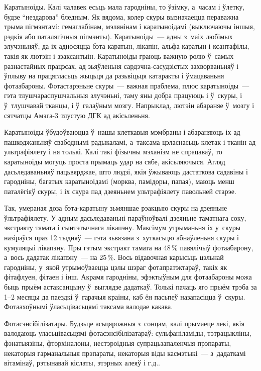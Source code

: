 Каратыноіды. Калі чалавек есьць мала гародніны, то ўзімку, а~часам і ўлетку, будзе ``нездарова'' бледным. Як вядома, колер скуры вызначаецца пераважна трыма пігмэнтамі: гемаглабінам, мэлянінам і каратыноідамі (выключаючы іншыя, рэдкія або паталягічныя пігмэнты). Каратыноіды~--- адны з~маіх любімых злучэньняў, да іх адносяцца бэта-каратын, лікапін, альфа-каратын і ксантафілы, такія як лютэін і зэаксантыін. Каратыноіды граюць важную ролю ў~самых разнастайных працэсах, ад зьяўленьня сардэчна-сасудзістых захворваньняў і ўплыву на працягласьць жыцьця да разьвіцьця катаракты і ўмацаваньня фотаабароны. Фотастарэньне скуры~--- важная праблема, плюс каратыноіды~--- гэта тлушчараспушчальныя злучэньні, таму яны добра працуюць і ў~скуры, і ў~тлушчавай тканцы, і ў~галаўным мозгу. Напрыклад, лютэін абараняе ў~мозгу і сятчатцы Амэга-3 тлустую ДГК ад акісьленьня. 

Каратыноіды ўбудоўваюцца ў~нашы клеткавыя мэмбраны і абараняюць іх ад пашкоджаньняў свабоднымі радыкаламі, а~таксама цэласнасьць клетак і тканін ад ультрафіялету і ня толькі. Калі такі фізычны мэханізм не спрацаваў, то каратыноіды могуць проста прымаць удар на сябе, акісьляючыся. Агляд дасьледаваньняў пацьвярджае, што людзі, якія ўжываюць дастаткова садавіны і гародніны, багатых каратыноідамі (морква, памідоры, папая), маюць менш паталёгіяў скуры, і іх скура пад дзеяньнем ультрафіялету павольней старэе.

Так, умераная доза бэта-каратыну зьмяншае рэакцыю скуры на дзеяньне ўльтрафіялету. У адным дасьледаваньні параўноўвалі дзеяньне таматнага соку, экстракту тамата і сынтэтычнага лікапэну. Максімум утрыманьня іх у~скуры назіраўся праз 12 тыдняў~--- гэта зьвязана з~хуткасьцю абнаўленьня скуры і кумуляцыі лікапэну. Пры гэтым экстракт тамата на 48\,\% павялічыў фотаабарону, а~вось дадатак лікапэну~--- на 25\,\%. Вось відавочная карысьць цэльнай гародніны, у~якой утрымоўваецца цэлы шэраг фотапратэктараў, такіх як фітафлуен, фітаен і інш. Акрамя гародніны, эфэктыўным для фотаабароны можа быць прыём астаксанцыну ў~выглядзе дадаткаў. Толькі пачаць яго прыём трэба за 1--2 месяцы да паездкі ў~гарачыя краіны, каб ён пасьпеў назапасіцца ў~скуры. Фотаахоўнымі ўласьцівасьцямі таксама валодае какава.

Фотасэнсібілізатары. Будзьце асьцярожныя з~сонцам, калі прымаеце лекі, якія валодаюць уласьцівасьцямі фотасэнсібілізатараў: сульфаніламіды, тэтрацыкліны, фэнатыязіны, фторхіналоны, нестэроідныя супрацьзапаленчыя прэпараты, некаторыя гарманальныя прэпараты, некаторыя віды касмэтыкі~--- з~дадаткамі вітамінаў, рэтынавай кіслаты, этэрных алеяў і г.д..

